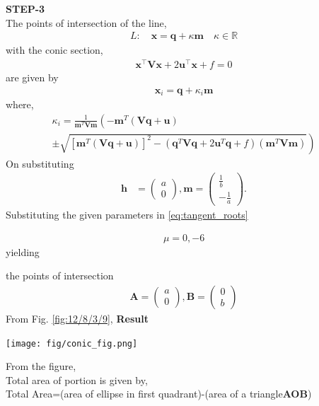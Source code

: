 \documentclass[10pt,a4paper]{report}
\newcommand{\myvec}[1]{\ensuremath{\begin{pmatrix}#1\end{pmatrix}}}
\let\vec\mathbf
\let\vec\mathbf
\providecommand{\brak}[1]{\ensuremath{\left(#1\right)}}
\providecommand{\lbrak}[1]{\ensuremath{\left(#1\right.}}
\providecommand{\rbrak}[1]{\ensuremath{\left.#1\right)}}
\providecommand{\sbrak}[1]{\ensuremath{{}\left[#1\right]}}
\begin{document}
\begin{multicols}{2}
\textbf{STEP-3}\vspace{2mm}\\
The points of intersection of the line, \\ 
\begin{align}
L: \quad \vec{x} = \vec{q} + \kappa \vec{m} \quad \kappa \in \mathbb{R}
\end{align}
with the conic section, \\ 
\begin{align}
	\vec{x}^{\top}\vec{V}\vec{x} + 2\vec{u}^{\top} \vec{x} + f = 0
\end{align}
are given by \\
\begin{align}
\vec{x}_i = \vec{q} + \kappa_i \vec{m}
\end{align}
where, \\
{\tiny
\begin{multline}
\kappa_i = \frac{1}
{
\vec{m}^T\vec{V}\vec{m}
}
\lbrak{-\vec{m}^T\brak{\vec{V}\vec{q}+\vec{u}}}
\\
\pm
\rbrak{\sqrt{
\sbrak{
\vec{m}^T\brak{\vec{V}\vec{q}+\vec{u}}
}^2
-
\brak
{
\vec{q}^T\vec{V}\vec{q} + 2\vec{u}^T\vec{q} +f
}
\brak{\vec{m}^T\vec{V}\vec{m}}
}
}
\end{multline}
}
On substituting\\
\fi
\begin{align}
\vec{h} &= \myvec{
a\\
0
}, 
\vec{m} = \myvec{\frac{1}{b} \\ -\frac{1}{a}}.
\end{align}
Substituting the given parameters in \eqref{eq:tangent_roots}

\begin{align}
    \mu=0,-6
\end{align}
yielding

the points of intersection 
\begin{align}
    \vec{A}=\myvec{
a\\
0
    },
    \vec{B}=\myvec{
0\\
b
    }
\end{align}
From Fig.
		\ref{fig:12/8/3/9},
		\iffalse
\textbf{Result}
\begin{center}
 \texttt{[image: fig/conic\_fig.png]}    
 \end{center}\vspace{1mm}
 From the figure,\\ \vspace{1mm}
Total area of portion is given by, \\ \vspace{1mm}
Total Area=(area of ellipse in first quadrant)-(area of a triangle\textbf{AOB})


\end{multicols}
\end{document}
